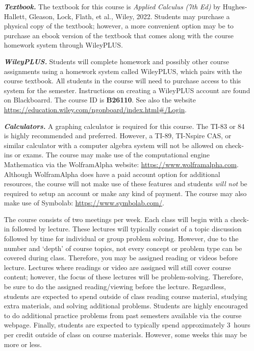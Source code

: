 \documentclass[11pt,letterpaper]{article}
\begin{document}

{\itshape\bfseries\color{scred}Textbook.} The textbook for this course is {\itshape Applied Calculus (7th Ed)} by Hughes-Hallett, Gleason, Lock, Flath, et al., Wiley, 2022. Students may purchase a physical copy of the textbook; however, a more convenient option may be to purchase an ebook version of the textbook that comes along with the course homework system through WileyPLUS. \pspace

{\itshape\bfseries\color{scred}WileyPLUS.} Students will complete homework and possibly other course assignments using a homework system called WileyPLUS, which pairs with the course textbook. All students in the course will need to purchase access to this system for the semester. Instructions on creating a WileyPLUS account are found on Blackboarrd. The course ID is \textbf{B26110}. See also the website \url{https://education.wiley.com/ngonboard/index.html\#/Login}. \pspace

{\itshape\bfseries\color{scred}Calculators.} A graphing calculator is required for this course. The TI-83 or 84 is highly recommended and preferred. However, a TI-89, TI-Nspire CAS, or similar calculator with a computer algebra system will not be allowed on check-ins or exams. The course may make use of the computational engine Mathematica via the WolframAlpha website: \url{https://www.wolframalpha.com}. Although WolframAlpha does have a paid account option for additional resources, the course will not make use of these features and students {\itshape will not} be required to setup an account or make any kind of payment. The course may also make use of Symbolab: \url{https://www.symbolab.com/}. 
\sectionbreak




The course consists of two meetings per week. Each class will begin with a check-in followed by lecture. These lectures will typically consist of a topic discussion followed by time for individual or group problem solving. However, due to the number and `depth' of course topics, not every concept or problem type can be covered during class. Therefore, you may be assigned reading or videos before lecture. Lectures where readings or video are assigned will still cover course content; however, the focus of these lectures will be problem-solving. Therefore, be sure to do the assigned reading/viewing before the lecture. Regardless, students are expected to spend outside of class reading course material, studying extra materials, and solving additional problems. Students are highly encouraged to do additional practice problems from past semesters available via the course webpage. Finally, students are expected to typically spend approximately 3~hours per credit outside of class on course materials. However, some weeks this may be more or less. 
\sectionbreak
\end{document}
